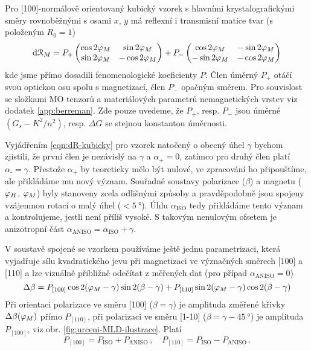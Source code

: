 Pro [100]-normálově orientovaný kubický vzorek s hlavními krystalografickými směry rovnoběžnými s osami $x$, $y$ má reflexní i transmisní matice tvar (s položeným $R_0=1$)
\begin{equation}
    \label{eqn:dR-kubicky}
    \textrm{d}\mathcal{R}_M = P_+ \begin{pmatrix} \cos2\varphi_M & \sin2\varphi_M\\ \sin2\varphi_M & -\cos2\varphi_M  \end{pmatrix}
    + P_- \begin{pmatrix} \cos2\varphi_M & -\sin2\varphi_M\\ -\sin2\varphi_M & -\cos2\varphi_M \end{pmatrix}
\end{equation}
kde jsme přímo dosadili fenomenologické koeficienty $P$.
Člen úměrný $P_+$ otáčí svou optickou osu spolu s magnetizací, člen $P_-$ opačným směrem.
Pro souvislost se složkami MO tenzorů a materiálových parametrů nemagnetických vrstev viz dodatek \ref{app:berreman}.
Zde pouze uvedeme, že $P_+$, resp. $P_-$ jsou úměrné $(G_s-K^2/n^2)$, resp. $\Delta G$ se stejnou konstantou úměrnosti.

Vyjádřením \eqref{eqn:dR-kubicky} pro vzorek natočený o obecný úhel $\gamma$ bychom zjistili, že první člen je nezávislý na $\gamma$ a $\alpha_\textrm{+}=0$, zatímco pro druhý člen platí $\alpha_\textrm{-}=\gamma$.
Přestože $\alpha_\textrm{+}$ by teoreticky mělo být nulové, ve zpracování ho připouštíme, ale přikládáme mu nový význam.
Souřadné soustavy polarizace ($\beta$) a magnetu ($\varphi_H$, $\varphi_M$) byly stanoveny zcela odlišnými způsoby a pravděpodobně jsou spojeny vzájemnou rotací o malý úhel ($<\SI{5}{\degree}$).
Úhlu $\alpha_\textrm{ISO}$ tedy přikládáme tento význam a kontrolujeme, jestli není příliš vysoké.
S takovým nenulovým ofsetem je anizotropní část $\alpha_\textrm{ANISO}=\alpha_\textrm{ISO}+\gamma$.

V soustavě spojené se vzorkem používáme ještě jednu parametrizaci, která vyjadřuje sílu kvadratického jevu při magnetizaci ve význačných směrech [100] a [110] a lze vizuálně přibližně odečítat z měřených dat (pro případ $\alpha_\textrm{ANISO}=0$)
\begin{equation}
    \Delta\beta = P_{[100]} \cos 2 (\varphi_M-\gamma) \sin 2(\beta-\gamma) + P_{[110]} \sin 2 (\varphi_M-\gamma) \cos 2(\beta-\gamma)
\end{equation}
Při orientaci polarizace ve směru [100] ($\beta=\gamma$) je amplituda změřené křivky $\Delta\beta(\varphi_M)$ přímo $P_{[110]}$, při polarizaci ve směru [1-10] ($\beta=\gamma-\SI{45}{\degree}$) je amplituda $P_{[100]}$, viz obr. \ref{fig:urceni-MLD-ilustrace}.
Platí
\begin{equation}
    P_{[100]} = P_\textrm{ISO} + P_\textrm{ANISO} \,,\quad P_{[110]} = P_\textrm{ISO} - P_\textrm{ANISO} \,.
\end{equation}


